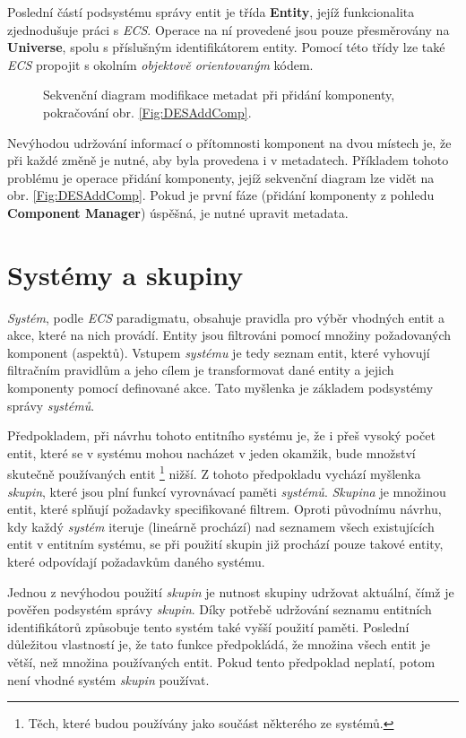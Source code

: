 Poslední částí podsystému správy entit je třída \textbf{Entity}, jejíž funkcionalita zjednodušuje práci s \emph{ECS}. Operace na ní provedené jsou pouze přesměrovány na \textbf{Universe}, spolu s příslušným identifikátorem entity. Pomocí této třídy lze také \emph{ECS} propojit s okolním \emph{objektově orientovaným} kódem.

\begin{figure}[H]
	\centering
	\caption{Sekvenční diagram modifikace metadat při přidání komponenty, pokračování obr. \ref{Fig:DESAddComp}.}
	\label{Fig:DESAddEnt}
\end{figure}

Nevýhodou udržování informací o přítomnosti komponent na dvou místech je, že při každé změně je nutné, aby byla provedena i v metadatech. Příkladem tohoto problému je operace přidání komponenty, jejíž sekvenční diagram lze vidět na obr. \ref{Fig:DESAddComp}. Pokud je první fáze (přidání komponenty z pohledu \textbf{Component Manager}) úspěšná, je nutné upravit metadata.

\section{Systémy a skupiny}
\label{Chap:SysGroup}

\emph{Systém}, podle \emph{ECS} paradigmatu, obsahuje pravidla pro výběr vhodných entit a akce, které na nich provádí. Entity jsou filtrováni pomocí množiny požadovaných komponent (aspektů). Vstupem \emph{systému} je tedy seznam entit, které vyhovují filtračním pravidlům a jeho cílem je transformovat dané entity a jejich komponenty pomocí definované akce. Tato myšlenka je základem podsystémy správy \emph{systémů}. 

Předpokladem, při návrhu tohoto entitního systému je, že i přeš vysoký počet entit, které se v systému mohou nacházet v jeden okamžik, bude množství skutečně používaných entit \footnote{Těch, které budou používány jako součást některého ze systémů.} nižší. Z tohoto předpokladu vychází myšlenka \emph{skupin}, které jsou plní funkcí vyrovnávací paměti \emph{systémů}. \emph{Skupina} je množinou entit, které splňují požadavky specifikované filtrem. Oproti původnímu návrhu, kdy každý \emph{systém} iteruje (lineárně prochází) nad seznamem všech existujících entit v entitním systému, se při použití skupin již prochází pouze takové entity, které odpovídají požadavkům daného systému.

Jednou z nevýhodou použití \emph{skupin} je nutnost skupiny udržovat aktuální, čímž je pověřen podsystém správy \emph{skupin}. Díky potřebě udržování seznamu entitních identifikátorů způsobuje tento systém také vyšší použití paměti. Poslední důležitou vlastností je, že tato funkce předpokládá, že množina všech entit je větší, než množina používaných entit. Pokud tento předpoklad neplatí, potom není vhodné systém \emph{skupin} používat.

